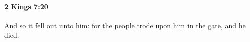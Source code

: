 
		\paragraph{2 Kings 7:20} %
			\label{2KINGS-7-20}

			And so it fell out unto him: for the people trode upon him in the gate, and he died.

